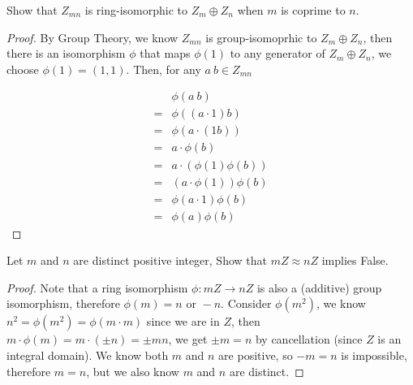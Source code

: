 \documentclass[../main.tex]{subfiles}
\begin{document}
\setcounter{exercise}{56}
\begin{exercise}
  Show that $Z_{mn}$ is ring-isomorphic to $Z_m \oplus Z_n$ when $m$ is coprime to $n$.
\end{exercise}
\begin{proof}
  By Group Theory, we know $Z_{mn}$ is group-isomoprhic to $Z_m \oplus Z_n$,
  then there is an isomorphism $\phi$ that maps $\phi(1)$ to any generator of $Z_m \oplus Z_n$,
  we choose $\phi(1) = (1, 1)$. Then, for any $a \ b \in Z_{mn}$

  \begin{align*}
     & \phi(a \ b) \\
    =& \phi( (a \cdot 1) b) \\
    =& \phi( a \cdot (1b)) \\
    =& a \cdot \phi(b) \\
    =& a \cdot (\phi(1) \phi(b)) \\
    =& (a \cdot \phi(1)) \phi(b) \\
    =& \phi(a \cdot 1) \phi(b) \\
    =& \phi(a) \phi(b)
  \end{align*}
\end{proof}

\begin{exercise}
  Let $m$ and $n$ are distinct positive integer, Show that $mZ \approx nZ$ implies False.
\end{exercise}
\begin{proof}
  Note that a ring isomorphism $\phi : mZ \rightarrow nZ$ 
  is also a (additive) group isomorphism,
  therefore $\phi(m) = n \text{ or } -n$.
  Consider $\phi(m^2)$, we know $n^2 = \phi(m^2) = \phi(m \cdot m)$ since we are in $Z$,
  then $m \cdot \phi(m) = m \cdot (\pm n) = \pm mn$, 
  we get $\pm m = n$ by cancellation (since $Z$ is an integral domain).
  We know both $m$ and $n$ are positive, so $-m = n$ is impossible, therefore $m = n$,
  but we also know $m$ and $n$ are distinct.
\end{proof}
\end{document}
